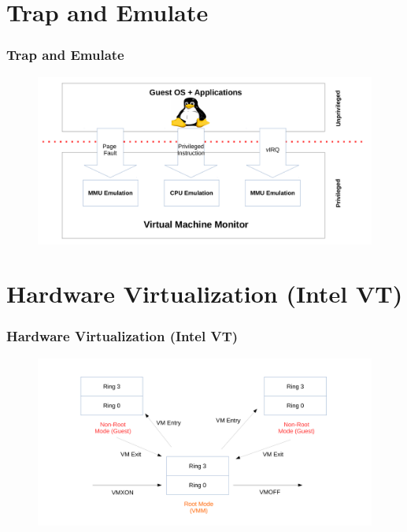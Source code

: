 \documentclass[aspectratio=169]{beamer}
\begin{document}
\section{Trap and Emulate}
\begin{frame}
\frametitle{Trap and Emulate}
\begin{figure}
\includegraphics[width=1.0\linewidth]{figures/trapemu.pdf}
\end{figure}
\end{frame}


\section{Hardware Virtualization (Intel VT)}
\begin{frame}
\frametitle{Hardware Virtualization (Intel VT)}
\begin{figure}
\includegraphics[width=1.0\linewidth]{figures/vmx.pdf}
\end{figure}
\end{frame}

\end{document}
